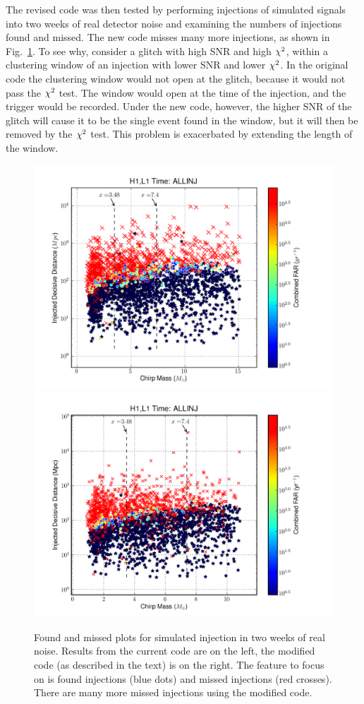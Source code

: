 The revised code was then tested by performing injections of simulated
signals into two weeks of real detector noise and examining the
numbers of injections found and missed.  The new code misses many more
injections, as shown in Fig.~\ref{f:found_missed_penguins}.  To see
why, consider a glitch with high SNR and high $\chi^2$, within a
clustering window of an injection with lower SNR and lower $\chi^2$.
In the original code the clustering window would not open at the
glitch, because it would not pass the $\chi^2$ test.  The window would
open at the time of the injection, and the trigger would be recorded.
Under the new code, however, the higher SNR of the glitch will cause
it to be the single event found in the window, but it will then be
removed by the $\chi^2$ test.  This problem is exacerbated by
extending the length of the window.

\begin{figure}
  \includegraphics[width=0.5\linewidth]{figures/detchar/penguin_foundmissed_orig}
  \includegraphics[width=0.5\linewidth]{figures/detchar/penguin_foundmissed_new}
  \caption[Found/missed plots showing the effect of new code] {
  \label{f:found_missed_penguins}
Found and missed plots for simulated injection in two weeks of real
noise.  Results from the current code are on the left, the modified
code (as described in the text) is on the right.  The feature to focus
on is found injections (blue dots) and missed injections (red
crosses).  There are many more missed injections using the modified
code.
}
\end{figure}%


